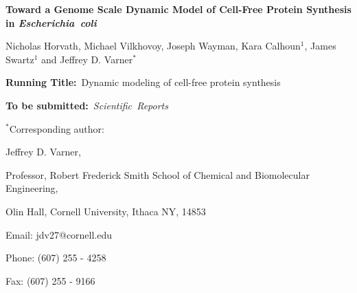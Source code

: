 \documentclass[12pt]{article}
\begin{document}
\begin{titlepage}
{\par\centering\textbf{\Large {Toward a Genome Scale Dynamic Model of Cell-Free Protein Synthesis in \emph{Escherichia~coli}}}}
\vspace{0.05in}
{\par \centering \large{Nicholas Horvath, Michael Vilkhovoy, Joseph Wayman, Kara Calhoun$^{1}$, James Swartz$^{1}$ and Jeffrey D. Varner$^{*}$}}
\vspace{0.10in}
{\par {}}
{\par {}}
\vspace{0.1in}
{\par {}}
{\par {}}
{\par \centering \textbf{Running Title:}~Dynamic modeling of cell-free protein synthesis}
\vspace{0.1in}
{\par \centering \textbf{To be submitted:}~\emph{Scientific~Reports}}
\vspace{0.5in}
{\par \centering $^{*}$Corresponding author:}
{\par \centering Jeffrey D. Varner,}
{\par \centering Professor, Robert Frederick Smith School of Chemical and Biomolecular Engineering,}
{\par {} Olin Hall, Cornell University, Ithaca NY, 14853}
{\par \centering Email: jdv27@cornell.edu}
{\par \centering Phone: (607) 255 - 4258}
{\par \centering Fax: (607) 255 - 9166}
\end{titlepage}
\date{}
\thispagestyle{empty}
\pagebreak
\end{document}
